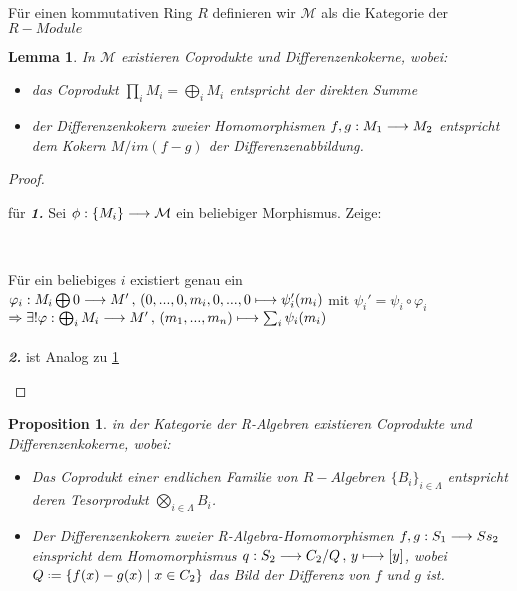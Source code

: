 \documentclass[10pt,a4paper]{report}
\newcounter{Aussage}[chapter]
\newtheorem{prop}[Aussage]{Proposition}
\newtheorem{lemma}[Aussage]{Lemma}
\newcommand{\functionfront}[3]{\nolinebreak{#1:#2 \longrightarrow #3}}
\newcommand{\function}[5]{\nolinebreak{#1:#2 \longrightarrow #3 \, , \, #4 \longmapsto #5}}
\newcommand{\infunctionfront}[3]{\nolinebreak{#1:#2 \hookrightarrow #3}}
\newcommand*{\defeq}{\mathrel{\vcenter{\baselineskip0.5ex \lineskiplimit0pt
                     \hbox{\scriptsize.}\hbox{\scriptsize.}}}%
                     =}
\newcommand{\immage}[1]{im(#1)}
\begin{document}
Für einen kommutativen Ring $R$ definieren wir $\mathcal{M}$ als die Kategorie der $R-Module$
\begin{lemma}\label{R-Modul-Colimiten}
In $\mathcal{M}$ existieren Coprodukte und Differenzenkokerne, wobei:
\begin{itemize}
\item[\textbf{1.}] das Coprodukt $\prod_i M_i = \bigoplus_i M_i$ entspricht der direkten Summe
\item[\textbf{2.}] der Differenzenkokern zweier Homomorphismen $\functionfront{f,g}{M_1}{M_2}$ entspricht dem Kokern $M/\immage{f-g}$ der Differenzenabbildung.
\end{itemize}
\end{lemma}
\begin{proof}
\begin{itemize}

für \textit{\textbf{1.}} Sei $\functionfront{\phi}{\lbrace M_i \rbrace}{\mathcal{M}}$ ein beliebiger Morphismus. Zeige: \\
\begin{center}
\\
\end{center}
Für ein beliebiges $i$ existiert genau ein $\function{\varphi_i}{M_i \bigoplus 0}{M'}{(0,...,0,m_i,0,...,0}{\psi_i '(m_i)}$
 mit $\psi_i ' = \psi_i \circ \varphi_i$\\
$\Rightarrow  \exists ! \function{\varphi}{\bigoplus_i M_i}{M'}{(m_1,...,m_n)}{\sum_i \psi_i(m_i)}$\\
\ \\
\textit{\textbf{2.}} ist Analog zu \cref{R-Algebra-Colimiten}
\end{itemize}
\end{proof}

\begin{prop} \label{R-Algebra-Colimiten}
in der Kategorie der R-Algebren existieren Coprodukte und Differenzenkokerne, wobei:
\begin{itemize}
\item[\textbf{1.}] Das Coprodukt einer endlichen Familie von $R-Algebren$ $\lbrace B_i \rbrace_{i \in \Lambda}$ entspricht deren Tesorprodukt $\bigotimes_{i \in \Lambda} B_i$. 
\item[\textbf{2.}] Der Differenzenkokern zweier R-Algebra-Homomorphismen $\functionfront{f,g}{S_1}{Ss_2}$ einspricht dem Homomorphismus $\function{q}{S_2}{C_2/Q}{y}{[y]}$, wobei $Q \defeq \lbrace f(x) - g(x)\mid x \in C_2 \rbrace$ das Bild der Differenz von $f$ und $g$ ist.
\end{itemize}
\end{prop}
\end{document}
